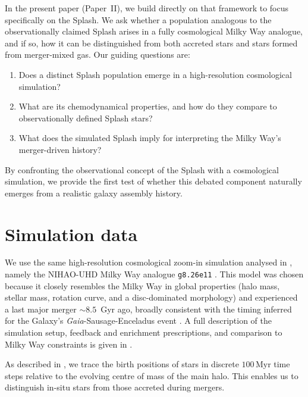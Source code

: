 \documentclass[fleqn,usenatbib]{mnras}
\begin{document}
In the present paper (Paper~II), we build directly on that framework to focus specifically on the Splash. We ask whether a population analogous to the observationally claimed Splash arises in a fully cosmological Milky Way analogue, and if so, how it can be distinguished from both accreted stars and stars formed from merger-mixed gas. 
Our guiding questions are:
\begin{enumerate}[leftmargin=2em,labelwidth=0em]
    \item Does a distinct Splash population emerge in a high-resolution cosmological simulation?
    \item What are its chemodynamical properties, and how do they compare to observationally defined Splash stars?
    \item What does the simulated Splash imply for interpreting the Milky Way’s merger-driven history?
\end{enumerate}

By confronting the observational concept of the Splash with a cosmological simulation, we provide the first test of whether this debated component naturally emerges from a realistic galaxy assembly history.

\section{Simulation data}
\label{sec:data}

We use the same high-resolution cosmological zoom-in simulation analysed in , namely the NIHAO-UHD Milky Way analogue \texttt{g8.26e11} \citep{Wang2015, Buck2020b, Buck2021}. This model was chosen because it closely resembles the Milky Way in global properties (halo mass, stellar mass, rotation curve, and a disc-dominated morphology) and experienced a last major merger $\sim 8.5$~Gyr ago, broadly consistent with the timing inferred for the Galaxy’s \textit{Gaia}-Sausage-Enceladus event \citep{Helmi2018, Naidu2020}. A full description of the simulation setup, feedback and enrichment prescriptions, and comparison to Milky Way constraints is given in .

As described in , we trace the birth positions of stars in discrete $100\,\mathrm{Myr}$ time steps relative to the evolving centre of mass of the main halo. This enables us to distinguish in-situ stars from those accreted during mergers.  
\end{document}
